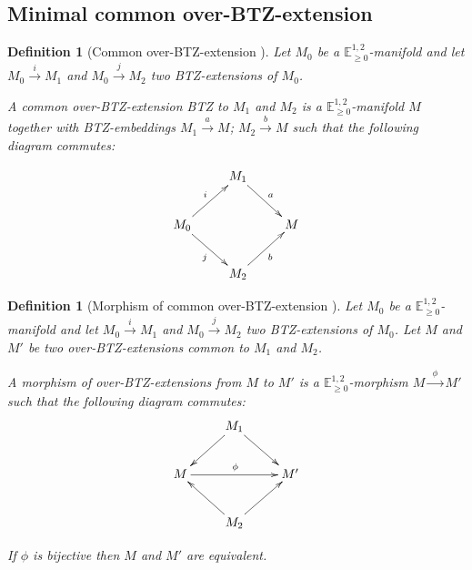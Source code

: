 \documentclass[a4paper,12pt]{article}
\newcommand{\mass}[1]{{\mathbb E}^{1,2}_{#1}}
\newtheorem{defou}[lemou]{Definition}    %
\begin{document}
\subsection{Minimal common over-BTZ-extension}
		\begin{defou}[Common over-BTZ-extension ] Let $M_0$ be a $\mass{\geq0}$-mani\-fold and let $M_0\xrightarrow{i} M_1$ and $M_0 \xrightarrow{j} M_2$
			two BTZ-extensions  of $M_0$. 

		A common over-BTZ-extension BTZ to $M_1$ and $M_2$ is a  $\mass{\geq0}$-manifold $M$ together with BTZ-embeddings
		$M_1\xrightarrow{a} M$; $M_2 \xrightarrow{b} M$ such that the following diagram commutes:

		$$
			\xymatrix{
				& M_1&\\
				M_0\ar[ur]^i \ar[dr]_j&&M\ar@{<-}[ul]_{a}\ar@{<-}[dl]^{b} \\
				& M_2&
			}		
		$$

		\end{defou}

		\begin{defou}[Morphism of common over-BTZ-extension ]
		Let $M_0$ be a $\mass{\geq0}$-manifold and let $M_0\xrightarrow{i} M_1$ and $M_0 \xrightarrow{j} M_2$
			two BTZ-extensions  of $M_0$.  Let $M$ and $M'$ be two over-BTZ-extensions common to $M_1$ and $M_2$.

		A morphism of over-BTZ-extensions from $M$ to $M'$ is a $\mass{\geq0}$-morphism $M\xrightarrow{~~\phi~~} M'$
		 such that the following diagram commutes:
		$$
			\xymatrix{
					&M_1 &\\
				M\ar@{<-}[ur]\ar@{<-}[dr]\ar[rr]^\phi& &M'\ar@{<-}[ul]\ar@{<-}[dl]\\
				& M_2 &
			}		
		$$

		If $\phi$ is bijective then $M$ and $M'$ are equivalent. 	
		\end{defou}
\end{document}
